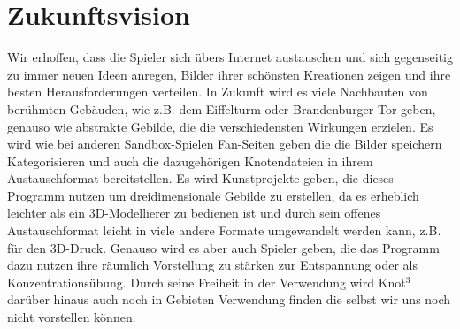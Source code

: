 
\chapter{Zukunftsvision}
\label{EF:Vorstellungen}
Wir erhoffen, dass die Spieler sich übers Internet austauschen und sich gegenseitig zu immer neuen Ideen anregen, Bilder ihrer schönsten Kreationen zeigen und ihre besten Herausforderungen verteilen. In Zukunft wird es viele Nachbauten von berühmten Gebäuden, wie z.B. dem Eiffelturm oder Brandenburger Tor geben, genauso wie abstrakte Gebilde, die die verschiedensten Wirkungen erzielen. Es wird wie bei anderen Sandbox-Spielen Fan-Seiten geben die die Bilder speichern Kategorisieren und auch die dazugehörigen Knotendateien in ihrem Austauschformat bereitstellen. Es wird Kunstprojekte geben, die dieses Programm nutzen um dreidimensionale Gebilde zu erstellen, da es erheblich leichter als ein 3D-Modellierer zu bedienen ist und durch sein offenes Austauschformat leicht in viele andere Formate umgewandelt werden kann, z.B. für den 3D-Druck. Genauso wird es aber auch Spieler geben, die das Programm dazu nutzen ihre räumlich Vorstellung zu stärken zur Entspannung oder als Konzentrationsübung.
Durch seine Freiheit in der Verwendung wird Knot$^3$ darüber hinaus auch noch in Gebieten Verwendung finden die selbst wir uns noch nicht vorstellen können.
